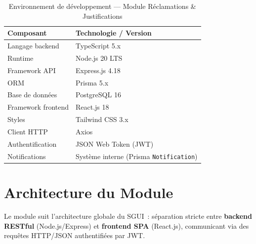 \begin{table}[H]
\centering
\caption{Environnement de développement — Module Réclamations \& Justifications}
\begin{tabular}{@{}ll@{}}
\toprule
\textbf{Composant}       & \textbf{Technologie / Version} \\
\midrule
Langage backend          & TypeScript 5.x                 \\
Runtime                  & Node.js 20 LTS                 \\
Framework API            & Express.js 4.18                \\
ORM                      & Prisma 5.x                     \\
Base de données          & PostgreSQL 16                  \\
Framework frontend       & React.js 18                    \\
Styles                   & Tailwind CSS 3.x               \\
Client HTTP              & Axios                          \\
Authentification         & JSON Web Token (JWT)           \\
Notifications            & Système interne (Prisma \texttt{Notification}) \\
\bottomrule
\end{tabular}
\end{table}

\section{Architecture du Module}

Le module suit l'architecture globale du SGUI~: séparation stricte entre
\textbf{backend RESTful} (Node.js/Express) et \textbf{frontend SPA}
(React.js), communicant via des requêtes HTTP/JSON authentifiées par JWT.

